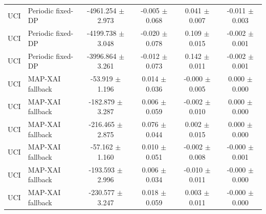 \begin{tabular}{llcccc}
UCI & Periodic fixed-DP & -4961.254 $\pm$ 2.973 & -0.005 $\pm$ 0.068 & 0.041 $\pm$ 0.007 & -0.011 $\pm$ 0.003 \\
UCI & Periodic fixed-DP & -4199.738 $\pm$ 3.048 & -0.020 $\pm$ 0.078 & 0.109 $\pm$ 0.015 & -0.002 $\pm$ 0.001 \\
UCI & Periodic fixed-DP & -3996.864 $\pm$ 3.261 & -0.012 $\pm$ 0.073 & 0.142 $\pm$ 0.011 & -0.002 $\pm$ 0.001 \\
UCI & MAP-XAI fallback & -53.919 $\pm$ 1.196 & 0.014 $\pm$ 0.036 & -0.000 $\pm$ 0.005 & 0.000 $\pm$ 0.000 \\
UCI & MAP-XAI fallback & -182.879 $\pm$ 3.287 & 0.006 $\pm$ 0.059 & -0.002 $\pm$ 0.010 & 0.000 $\pm$ 0.000 \\
UCI & MAP-XAI fallback & -216.465 $\pm$ 2.875 & 0.076 $\pm$ 0.044 & 0.002 $\pm$ 0.015 & 0.000 $\pm$ 0.000 \\
UCI & MAP-XAI fallback & -57.162 $\pm$ 1.160 & 0.010 $\pm$ 0.051 & -0.002 $\pm$ 0.008 & -0.000 $\pm$ 0.001 \\
UCI & MAP-XAI fallback & -193.593 $\pm$ 2.996 & 0.006 $\pm$ 0.034 & -0.010 $\pm$ 0.011 & -0.000 $\pm$ 0.000 \\
UCI & MAP-XAI fallback & -230.577 $\pm$ 3.247 & 0.018 $\pm$ 0.059 & 0.003 $\pm$ 0.011 & -0.000 $\pm$ 0.000 \\
\bottomrule
\end{tabular}
